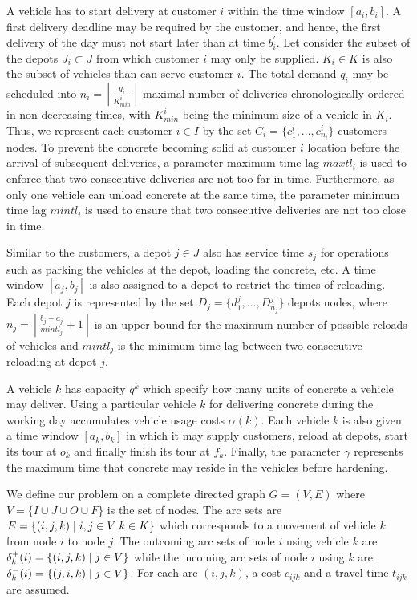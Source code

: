 \documentclass{article}
\begin{document}
{A vehicle has to start delivery at customer $i$ within the time window $\left[a_i,b_i\right]$. A first delivery deadline may be required by the customer, and hence, the first delivery of the day must not start later than at time $b^{'}_i$. Let consider the subset of the depots $J_i \subset J$ from which customer $i$ may only be supplied. $K_i \in K$ is also the subset of vehicles than can serve customer $i$. The total demand $q_i$ may be scheduled into $n_i=\left\lceil {\frac{q_i}{K^i_{min}}} \right\rceil$  maximal number of deliveries chronologically ordered in non-decreasing times, with $K^i_{min}$ being the minimum size of a vehicle in $K_i$. Thus, we represent each customer $i \in I$ by the set $C_i = \{c^i_{1},...,c^i_{n_i}\}$ customers nodes. To prevent the concrete becoming solid at customer $i$ location before the arrival of subsequent deliveries, a parameter maximum time lag $maxtl_i$ is used to enforce that two consecutive deliveries are not too far in time. Furthermore, as only one vehicle can unload concrete at the same time, the parameter minimum time lag $mintl_i$ is used to ensure that two consecutive deliveries are not too close in time.

Similar to the customers, a depot $j \in J$ also has service time $s_j$ for operations such as parking the vehicles at the depot, loading the concrete, etc. A time window $[a_j,b_j]$ is also assigned to a depot to restrict the times of reloading. Each depot $j$ is represented by the set $ D_j = \{d^j_{1},...,D^j_{n_j}\}$ depots nodes, where $n_j=\left\lceil {\frac{b_j-a_j}{mintl_j}+1} \right\rceil$ is an upper bound for the maximum number of possible reloads of vehicles and $mintl_j$ is the minimum time lag between two consecutive reloading at depot $j$.

A vehicle $k$ has capacity $q^k$ which specify how many units of concrete a vehicle may deliver. Using a particular vehicle $k$ for delivering concrete during the working day accumulates vehicle usage costs $\alpha(k)$. Each vehicle $k$ is also given a time window $[a_k,b_k]$ in which it may supply customers, reload at depots, start its tour at $o_k$ and finally finish its tour at $f_k$. Finally, the parameter $\gamma$ represents the maximum time that concrete may reside in the vehicles before hardening.

We define our problem on a complete directed graph $G = (V, E)$ where $V=\{ I \cup J \cup O \cup F\}$ is the set of nodes. The arc sets are $E = \{(i,j,k) \hspace*{1mm} \vert \hspace*{1mm} i, j \in V \hspace{1mm} k\in K \}$ which corresponds to a movement of vehicle $k$ from node $i$ to node $j$. The outcoming arc sets of node $i$ using vehicle $k$ are $\delta_k^{+}(i) = \{(i, j,k) \hspace*{1mm} \vert \hspace*{1mm}  j \in V \}$ while the incoming arc sets of node $i$ using $k$ are $\delta_k^{-}(i) = \{(j, i,k) \hspace*{1mm} \vert \hspace*{1mm}  j \in V \}$.  For each arc $(i,j,k)$, a cost $c_{ijk}$ and a travel time $t_{ijk}$ are assumed.

}
\end{document}
